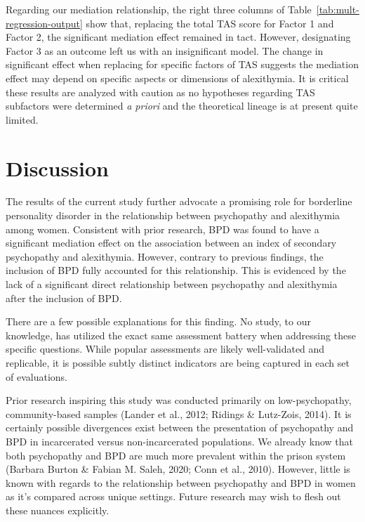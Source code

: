 \documentclass[
  man,floatsintext]{apa7}
\begin{document}
Regarding our mediation relationship, the right three columns of Table~\ref{tab:mult-regression-output} show that, replacing the total TAS score for Factor 1 and Factor 2, the significant mediation effect remained in tact. However, designating Factor 3 as an outcome left us with an insignificant model. The change in significant effect when replacing for specific factors of TAS suggests the mediation effect may depend on specific aspects or dimensions of alexithymia. It is critical these results are analyzed with caution as no hypotheses regarding TAS subfactors were determined \emph{a priori} and the theoretical lineage is at present quite limited.

\hypertarget{discussion}{%
\section{Discussion}\label{discussion}}

The results of the current study further advocate a promising role for borderline personality disorder in the relationship between psychopathy and alexithymia among women. Consistent with prior research, BPD was found to have a significant mediation effect on the association between an index of secondary psychopathy and alexithymia. However, contrary to previous findings, the inclusion of BPD fully accounted for this relationship. This is evidenced by the lack of a significant direct relationship between psychopathy and alexithymia after the inclusion of BPD.

There are a few possible explanations for this finding. No study, to our knowledge, has utilized the exact same assessment battery when addressing these specific questions. While popular assessments are likely well-validated and replicable, it is possible subtly distinct indicators are being captured in each set of evaluations.

Prior research inspiring this study was conducted primarily on low-psychopathy, community-based samples (Lander et al., 2012; Ridings \& Lutz-Zois, 2014). It is certainly possible divergences exist between the presentation of psychopathy and BPD in incarcerated versus non-incarcerated populations. We already know that both psychopathy and BPD are much more prevalent within the prison system (Barbara Burton \& Fabian M. Saleh, 2020; Conn et al., 2010). However, little is known with regards to the relationship between psychopathy and BPD in women as it's compared across unique settings. Future research may wish to flesh out these nuances explicitly.
\end{document}
